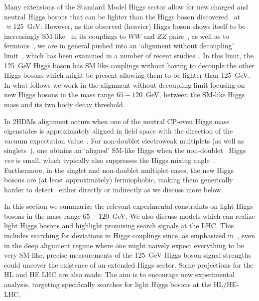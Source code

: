 \documentclass[../report.tex]{subfiles}
\begin{document}
Many extensions of the Standard Model Higgs sector allow for new
charged and neutral Higgs bosons that can be lighter than the Higgs
boson discovered~\cite{Aad:2012tfa,Chatrchyan:2012xdj} at $\approx 125$~GeV. 
However, as the observed (heavier) Higgs boson shows itself to be 
increasingly SM-like~\cite{Falkowski:2013dza} in its couplings to $WW$
and $ZZ$ pairs~\cite{Khachatryan:2014kca,Khachatryan:2016vau,Sirunyan:2017exp,Sirunyan:2017tqd,Aaboud:2017oem,Falkowski:2013dza},
as well as to fermions~\cite{Aaboud:2018zhk,CMS:2018abb}, we are in
general pushed into an `alignment without decoupling'
limit~\cite{Gunion:2002zf,Carena:2013ooa}, which has been examined in a
number of recent
studies~\cite{Craig:2013hca,Carena:2014nza,Carena:2015moc,Bernon:2015wef,Profumo:2016zxo,Bechtle:2016kui,Haber:2017erd,Bahl:2018zmf}. In
this limit, the 125~GeV Higgs boson has SM like couplings without having
to decouple the other Higgs bosons which might be present allowing them
to be lighter than 125~GeV. In what follows we work in the alignment
without decoupling limit focusing on new Higgs bosons in the mass range
$65 - 120$~GeV, between the SM-like Higgs mass and its two body decay
threshold. 

In 2HDMs alignment occurs when one of the
neutral CP-even Higgs mass eigenstates is approximately aligned in field
space with the direction of the vacuum expectation value~\cite{Carena:2013ooa,Bernon:2015wef}. For non-doublet
electroweak multiplets (as well as singlets~\cite{Robens:2015gla}), one
obtains an `aligned' SM-like Higgs when the
non-doublet~\cite{Georgi:1985nv,Killick:2013mya} Higgs \emph{vev} is
small, which typically also suppresses the Higgs mixing
angle~\cite{Haber:1978jt,Hartling:2014zca}. Furthermore, in the singlet
and non-doublet multiplet cases, the new Higgs bosons are (at least
approximately) fermiophobic, making them generically harder to
detect~\cite{Akeroyd:1998ui,Akeroyd:1995hg,Delgado:2016arn,Vega:2018ddp}
either directly or indirectly as we discuss more below.  

In this section we summarize the relevant experimental constraints on
light Higgs bosons in the mass range $65 - 120$~GeV. We also discuss
models which can realize light Higgs bosons and highlight promising
search signals at the LHC. This includes searching for deviations in
Higgs couplings since, as emphasized in~\cite{Bernon:2015wef}, even in
the deep alignment regime where one might naively expect everything to
be very SM-like, precise measurements of the 125~GeV Higgs boson signal
strengths could uncover the existence of an extended Higgs sector. Some
projections for the HL and HE LHC are also made. 
The aim is to encourage new experimental analysis, targeting
specifically searches for light Higgs bosons at the HL/HE-LHC.
\end{document}
